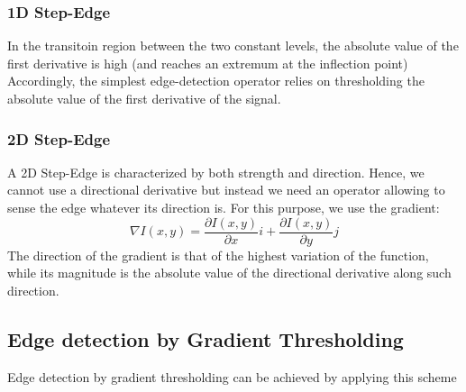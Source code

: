 \documentclass{article}
\begin{document}
\subsubsection{1D Step-Edge} %
In the transitoin region between the two constant levels, the absolute value of the first derivative is high (and reaches an extremum at the inflection point)
Accordingly, the simplest edge-detection operator relies on thresholding the absolute value of the first derivative of the signal. 
\subsubsection{2D Step-Edge}
A 2D Step-Edge is characterized by both strength and direction. Hence, we cannot use a directional derivative but instead we need an operator allowing to sense the edge whatever its direction is. For this purpose, we use the gradient:
\[
    \nabla I(x,y)=\displaystyle\frac{\partial I (x,y)}{\partial x}i + \displaystyle\frac{\partial I (x,y)}{\partial y} j
\]
The direction of the gradient is that of the highest variation of the function, while its magnitude is the absolute value of the directional derivative along such direction. 

\subsection{Edge detection by Gradient Thresholding}
Edge detection by gradient thresholding can be achieved by applying this scheme 
\end{document}

